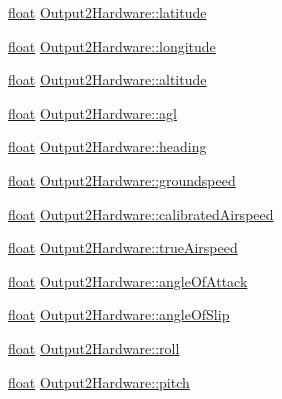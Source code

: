 \begin{DoxyCompactItemize}
\item 
\hyperlink{_super_l_u_support_8h_a6a1bb6ed41f44b60e7bd83b0e9945aa7}{float} \hyperlink{group___h_i_t_l_plugin_ga3f453b19b12f4264ebffe76a1e8ee93d}{Output2\-Hardware\-::latitude}
\item 
\hyperlink{_super_l_u_support_8h_a6a1bb6ed41f44b60e7bd83b0e9945aa7}{float} \hyperlink{group___h_i_t_l_plugin_gacf92ed715333315d33a77f42aa1ed71e}{Output2\-Hardware\-::longitude}
\item 
\hyperlink{_super_l_u_support_8h_a6a1bb6ed41f44b60e7bd83b0e9945aa7}{float} \hyperlink{group___h_i_t_l_plugin_gafbb52a0b15f16cac6f1efbcae3702e96}{Output2\-Hardware\-::altitude}
\item 
\hyperlink{_super_l_u_support_8h_a6a1bb6ed41f44b60e7bd83b0e9945aa7}{float} \hyperlink{group___h_i_t_l_plugin_ga40e8c62b6079618b6541408ce3dafe0c}{Output2\-Hardware\-::agl}
\item 
\hyperlink{_super_l_u_support_8h_a6a1bb6ed41f44b60e7bd83b0e9945aa7}{float} \hyperlink{group___h_i_t_l_plugin_ga061c55e7f046212595dae9123b2589d8}{Output2\-Hardware\-::heading}
\item 
\hyperlink{_super_l_u_support_8h_a6a1bb6ed41f44b60e7bd83b0e9945aa7}{float} \hyperlink{group___h_i_t_l_plugin_ga6cab485f36b93a2e86e248bcc6b240f1}{Output2\-Hardware\-::groundspeed}
\item 
\hyperlink{_super_l_u_support_8h_a6a1bb6ed41f44b60e7bd83b0e9945aa7}{float} \hyperlink{group___h_i_t_l_plugin_gaa6ec37dae61764737236528ba5a2445c}{Output2\-Hardware\-::calibrated\-Airspeed}
\item 
\hyperlink{_super_l_u_support_8h_a6a1bb6ed41f44b60e7bd83b0e9945aa7}{float} \hyperlink{group___h_i_t_l_plugin_gaca71e282fd00490c801905254e99ef54}{Output2\-Hardware\-::true\-Airspeed}
\item 
\hyperlink{_super_l_u_support_8h_a6a1bb6ed41f44b60e7bd83b0e9945aa7}{float} \hyperlink{group___h_i_t_l_plugin_gaa698baa5c5eb08252558e7821e3d48dd}{Output2\-Hardware\-::angle\-Of\-Attack}
\item 
\hyperlink{_super_l_u_support_8h_a6a1bb6ed41f44b60e7bd83b0e9945aa7}{float} \hyperlink{group___h_i_t_l_plugin_ga03a3c3371749ca83551e6f29e804a205}{Output2\-Hardware\-::angle\-Of\-Slip}
\item 
\hyperlink{_super_l_u_support_8h_a6a1bb6ed41f44b60e7bd83b0e9945aa7}{float} \hyperlink{group___h_i_t_l_plugin_ga8f2327775c3342e13799a4ed6392f23f}{Output2\-Hardware\-::roll}
\item 
\hyperlink{_super_l_u_support_8h_a6a1bb6ed41f44b60e7bd83b0e9945aa7}{float} \hyperlink{group___h_i_t_l_plugin_gaf92e2c90046782813af0a2fdd6e48bf4}{Output2\-Hardware\-::pitch}

\end{DoxyCompactItemize}
